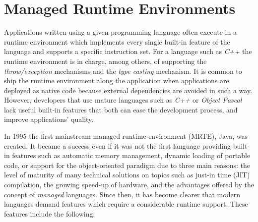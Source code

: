 \begin{comment}
El objetivo de esta seccion es dar una fundamentacion clara sobre las motivaciones que guian esta tesis y mostrar los temas en los que estara enfocada.

Es una seccion general que sin embargo tendra citas lo mas actualizadas posible en las secciones cables. La longitud estimada es de 2 a 3 paginas.

\end{comment}

\section{Managed Runtime Environments} \label{sec:mrtes}

Applications written using a given programming language often execute in a runtime environment which implements every single built-in feature of the language and supports a specific instruction set.
For a language such as \textit{C++} the runtime environment is in charge, among others, of supporting the \textit{throw/exception} mechanisms and the \textit{type casting} mechanism.
It is common to ship the runtime environment along the application when applications are deployed as native code because external dependencies are avoided in such a way.
However, developers that use mature languages such as \textit{C++} or \textit{Object Pascal} lack useful built-in features that both can ease the development process, and improve applications' quality.

In 1995 the first mainstream managed runtime environment (MRTE), Java, was created. It became a success even if it was not the first language providing built-in features such as automatic memory management, dynamic loading of portable code, or support for the object-oriented paradigm due to three main reasons: the level of maturity of many technical solutions on topics such as just-in time (JIT) compilation, the growing speed-up of hardware, and the advantages offered by the concept of \textit{managed} languages.
Since then, it has become clearer that modern languages demand features which require a considerable runtime support.
These features include the following:

